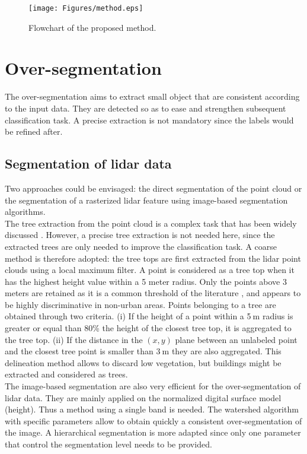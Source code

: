 \begin{figure}[htbp]
\begin{center}
\texttt{[image: Figures/method.eps]}
\caption{Flowchart of the proposed method.}
\label{fig:flowchart}
\end{center}
\end{figure}

\section{Over-segmentation}
The over-segmentation aims to extract small object that are consistent according to the input data. They are detected so as to ease and strengthen subsequent classification task. A precise extraction is not mandatory since the labels would be refined after.

\subsection{Segmentation of lidar data}
Two approaches could be envisaged: the direct segmentation of the point cloud or the segmentation of a rasterized lidar feature using image-based segmentation algorithms. \\

The tree extraction from the point cloud is a complex task that has been widely discussed \citep{dalponte2014tree, vega2014ptrees, kandare2014new}. However, a precise tree extraction is not needed here, since the extracted trees are only needed to improve the classification task. A coarse method is therefore adopted: the tree tops are first extracted from the lidar point clouds using a local maximum filter. A point is considered as a tree top when it has the highest height value within a 5 meter radius. Only the points above 3$\:$meters are retained as it is a common threshold of the literature \citep{eysn2012forest}, and appears to be highly discriminative in non-urban areas. Points belonging to a tree are obtained through two criteria. (i) If the height of a point within a 5$\:$m radius is greater or equal than 80\% the height of the closest tree top, it is aggregated to the tree top. (ii) If the distance in the  $(x,y)$ plane between an unlabeled point and the closest tree point is smaller than 3$\:$m  they are also aggregated. This delineation method allows to discard low vegetation, but buildings might be extracted and considered as trees. \\

The image-based segmentation are also very efficient for the over-segmentation of lidar data. They are mainly applied on the normalized digital surface model (height). Thus a method using a single band is needed. The watershed algorithm \citep{vincent1991watersheds} with specific parameters allow to obtain quickly a consistent over-segmentation of the image. A hierarchical segmentation \citep{guigues2006scale} is more adapted since only one parameter that control the segmentation level needs to be provided.

